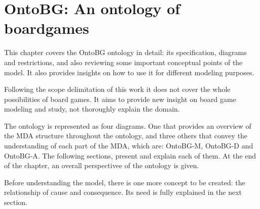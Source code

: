 \chapter{OntoBG: An ontology of boardgames}


This chapter covers the OntoBG ontology in detail: its specification, diagrams and restrictions, and also reviewing some important conceptual points of the model. It also provides insights on how to use it for different modeling purposes.

Following the scope delimitation of this work it does not cover the whole possibilities of board games. It aims to provide new insight on board game modeling and study, not thoroughly explain the domain.

The ontology is represented as four diagrams. One that provides an overview of the MDA structure throughout the ontology, and three others that convey the understanding of each part of the MDA, which are: OntoBG-M, OntoBG-D and OntoBG-A. The following sections, present and explain each of them. At the end of the chapter, an overall perspectivee of the ontology is given. 


Before understanding the model, there is one more concept to be created: the relationship of cause and consequence. Its need is fully explained in the next section.







